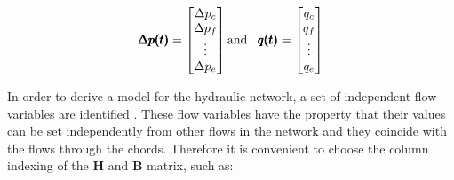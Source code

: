
\begin{equation}
\pmb{\Delta p(t)} =
\begin{bmatrix}
         \Delta p_c \\
	\Delta p_f \\ 
	\vdots \\
	\Delta p_e \\
\end{bmatrix}
\text{and}\hspace{0.3cm}
\pmb{q(t)} =
\begin{bmatrix}
         q_c \\
	q_f \\ 
	\vdots \\
	q_e \\
\end{bmatrix}
\end{equation}


In order to derive a model for the hydraulic network, a set of independent flow variables are identified \cite{TowerModel}. These flow variables have the property that their values can be set independently from other flows in the network and they coincide with the flows through the chords. 
Therefore it is convenient to choose the column indexing of the 
$\pmb{H}$ and $\pmb{B}$ matrix, such as:



